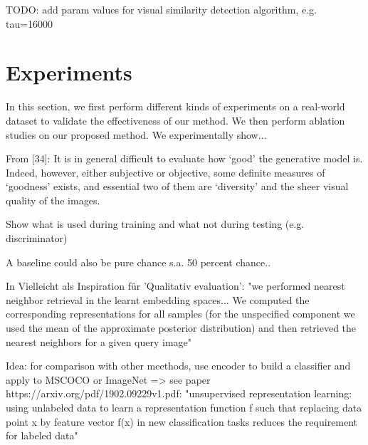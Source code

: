 \documentclass[12pt,a4paper]{article}
\begin{document}
TODO: add param values for visual similarity detection algorithm, e.g. tau=16000

\newpage
\section{Experiments}\label{sec:experiments}
In this section, we first perform different kinds of experiments on a real-world dataset to validate the
effectiveness of our method. We then perform ablation studies on our proposed
method. 
We experimentally show...


From [34]: It is in general difficult to evaluate how ‘good’ the generative model is. Indeed, however, either subjective or objective, some definite measures of ‘goodness’ exists, and essential two of them are ‘diversity’ and the sheer visual quality of the images.

\par Show what is used during training and what not during testing (e.g. discriminator)
    
\par A baseline could also be pure chance s.a. 50 percent chance..

\par In \cite{1611.03383} Vielleicht als Inspiration für 'Qualitativ evaluation': "we performed nearest neighbor retrieval in the learnt embedding spaces... We computed the corresponding representations for all samples (for the unspecified component we used the mean of the approximate posterior distribution) and then retrieved the nearest neighbors for a given query image"

\par Idea: for comparison with other meethods, use encoder to build a classifier and apply to MSCOCO or ImageNet => see paper https://arxiv.org/pdf/1902.09229v1.pdf: "unsupervised representation learning: using unlabeled data to learn a representation function f such that replacing data point x by feature vector f(x) in new classification tasks reduces the requirement for labeled data"
\end{document}
